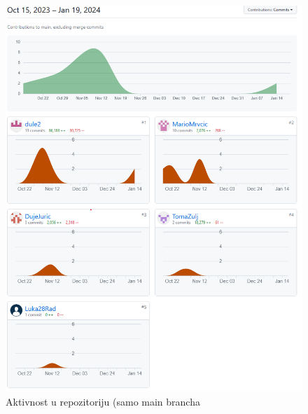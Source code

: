 		 \begin{figure}[H]
			\includegraphics[width=\textwidth]{slike/Aktivnost.PNG} %
			\caption{Aktivnost u repozitoriju (samo main brancha}
			\label{fig:Aktivnost} %
		\end{figure}
			\eject 
		
	
